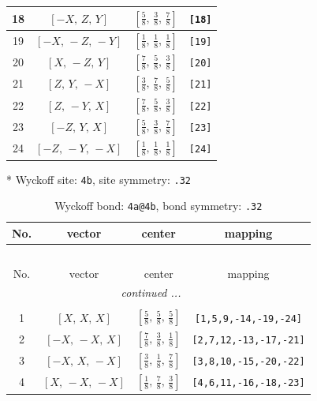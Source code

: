 \documentclass[fleqn,8pt]{jsarticle}
\begin{document}
\begin{longtable}{cccc}
18 & $\left[ - X,\, Z,\, Y \right]$ & $\left[ \frac{5}{8},\, \frac{3}{8},\, \frac{7}{8} \right]$ & {\tt [18]} \\ \hline
19 & $\left[ - X,\, - Z,\, - Y \right]$ & $\left[ \frac{1}{8},\, \frac{1}{8},\, \frac{1}{8} \right]$ & {\tt [19]} \\ \hline
20 & $\left[ X,\, - Z,\, Y \right]$ & $\left[ \frac{7}{8},\, \frac{5}{8},\, \frac{3}{8} \right]$ & {\tt [20]} \\ \hline
21 & $\left[ Z,\, Y,\, - X \right]$ & $\left[ \frac{3}{8},\, \frac{7}{8},\, \frac{5}{8} \right]$ & {\tt [21]} \\ \hline
22 & $\left[ Z,\, - Y,\, X \right]$ & $\left[ \frac{7}{8},\, \frac{5}{8},\, \frac{3}{8} \right]$ & {\tt [22]} \\ \hline
23 & $\left[ - Z,\, Y,\, X \right]$ & $\left[ \frac{5}{8},\, \frac{3}{8},\, \frac{7}{8} \right]$ & {\tt [23]} \\ \hline
24 & $\left[ - Z,\, - Y,\, - X \right]$ & $\left[ \frac{1}{8},\, \frac{1}{8},\, \frac{1}{8} \right]$ & {\tt [24]} \\
\end{longtable}
* Wyckoff site: {\tt 4b}, site symmetry: {\tt .32}
\renewcommand{\arraystretch}{1.2}
\begin{longtable}{cccc}
\caption{Wyckoff bond: {\tt 4a@4b}, bond symmetry: {\tt .32}}
 \\
 \hline \hline
No. & vector & center & mapping \\ \hline \endfirsthead

\multicolumn{3}{l}{\tablename\ \thetable{}} \\
 \hline \hline
No. & vector & center & mapping \\ \hline \endhead

 \hline \hline
\multicolumn{3}{r}{\footnotesize\it continued ...} \\ \endfoot

 \hline \hline
\multicolumn{3}{r}{} \\ \endlastfoot

1 & $\left[ X,\, X,\, X \right]$ & $\left[ \frac{5}{8},\, \frac{5}{8},\, \frac{5}{8} \right]$ & {\tt [1,5,9,-14,-19,-24]} \\ \hline
2 & $\left[ - X,\, - X,\, X \right]$ & $\left[ \frac{7}{8},\, \frac{3}{8},\, \frac{1}{8} \right]$ & {\tt [2,7,12,-13,-17,-21]} \\ \hline
3 & $\left[ - X,\, X,\, - X \right]$ & $\left[ \frac{3}{8},\, \frac{1}{8},\, \frac{7}{8} \right]$ & {\tt [3,8,10,-15,-20,-22]} \\ \hline
4 & $\left[ X,\, - X,\, - X \right]$ & $\left[ \frac{1}{8},\, \frac{7}{8},\, \frac{3}{8} \right]$ & {\tt [4,6,11,-16,-18,-23]} \\
\end{longtable}
\end{document}
